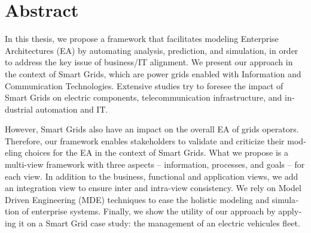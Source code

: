 \chapter*{Abstract}
\begin{otherlanguage}{english}
In this thesis, we propose a framework that facilitates modeling Enterprise Architectures (EA) by automating analysis, prediction, and simulation, in order to address the key issue of business/IT alignment. We present our approach in the context of Smart Grids, which are power grids enabled with Information and Communication Technologies. Extensive studies try to foresee the impact of Smart Grids on electric components, telecommunication infrastructure, and industrial automation and IT.

However, Smart Grids also have an impact on the overall EA of grids operators. Therefore, our framework enables stakeholders to validate and criticize their modeling choices for the EA in the context of Smart Grids. What we propose is a multi-view framework with three aspects -- information, processes, and goals -- for each view. In addition to the business, functional and application views, we add an integration view to ensure inter and intra-view consistency. We rely on Model Driven Engineering (MDE) techniques to ease the holistic modeling and simulation of enterprise systems. Finally, we show the utility of our approach by applying it on a Smart Grid case study: the management of an electric vehicules fleet.
\end{otherlanguage}
